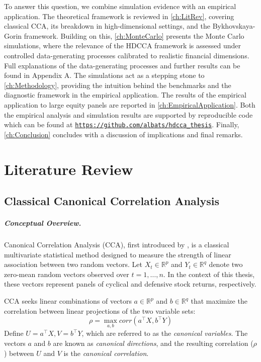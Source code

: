 \documentclass[12pt]{report} %
\begin{document}
To answer this question, we combine simulation evidence with an empirical application. The 
theoretical framework is reviewed in \autoref{ch:LitRev}, covering classical CCA, its breakdown 
in high-dimensional settings, and the Bykhovskaya-Gorin framework. Building on this, 
\autoref{ch:MonteCarlo} presents the Monte Carlo simulations, where the relevance of the 
HDCCA framework is assessed under controlled data-generating processes calibrated to realistic 
financial dimensions.  Full explanations of the data-generating processes and further results 
can be found in Appendix A.
The simulations act as a stepping stone to \autoref{ch:Methodology}, 
providing the intuition behind the benchmarks and the diagnostic framework in the 
empirical application. The results of the empirical application to large equity panels are 
reported in \autoref{ch:EmpiricalApplication}. 
Both the empirical analysis and simulation results are supported by reproducible code 
which can be found at \texttt{\url{https://github.com/albats/hdcca_thesis}}.
Finally, \autoref{ch:Conclusion} concludes with a discussion of implications and final remarks.

\chapter{Literature Review}
\label{ch:LitRev}

\section{Classical Canonical Correlation Analysis}

\paragraph{Conceptual Overview.}

Canonical Correlation Analysis (CCA), first introduced by \citet{Hotelling1936}, 
is a classical multivariate statistical method designed to measure the 
strength of linear association between two random vectors. Let $X_t \in \mathbb{R}^p$ 
and $Y_t \in \mathbb{R}^q$ denote two zero-mean random vectors observed over $t = 1, \dots, n$. 
In the context of this thesis, these vectors represent panels of cyclical and defensive 
stock returns, respectively. 

CCA seeks linear combinations of vectors $a \in \mathbb{R}^p$ and $b \in \mathbb{R}^q$ that 
maximize the correlation between linear projections of the two variable sets: 
\[
\rho= \max_{a, b} corr(a^\top X,b^\top Y)
\]
Define $U = a^\top X, V = b^\top Y$, which are referred to as the \emph{canonical variables}. 
The vectors $a$ and $b$ are known as \emph{canonical directions}, and the resulting 
correlation ($\rho$) between $U$ and $V$ is the \emph{canonical correlation}. 
\end{document}
